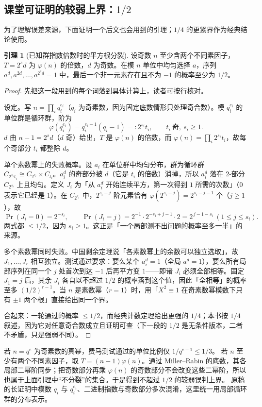 \documentclass[UTF8,a4paper,11pt,twoside,openright,fontset=fandol]{ctexbook}
\theoremstyle{definition}
\newtheorem{lemma}[definition]{引理}
\begin{document}
\subsection{课堂可证明的较弱上界：\texorpdfstring{$1/2$}{1/2}}
为了理解误差来源，下面证明一个后文也会用到的引理；$1/4$ 的更紧界作为经典结论使用。
\begin{lemma}[已知群指数倍数时的平方根分裂]
设奇数 $n$ 至少含两个不同素因子，$T=2^s d$ 为 $\varphi(n)$ 的倍数，$d$ 为奇数。在模 $n$ 单位中均匀选择 $a$，序列 $a^d,a^{2d},\ldots,a^{2^sd}=1$ 中，最后一个非一元素存在且不为 $-1$ 的概率至少为 $1/2$。
\end{lemma}
\begin{proof}
先把这一段用到的每个词落到具体计算上，读者可按行核对。

设定。写 $n=\prod_i q_i^{e_i}$（$q_i$ 为奇素数，因为固定底数情形只处理奇合数）。模 $q_i^{e_i}$ 的单位群是循环群，阶为
\[
 \varphi(q_i^{e_i})=q_i^{e_i-1}(q_i-1)=:2^{s_i}t_i,\qquad t_i\ \text{奇},\ s_i\ge1 .
\]
$d$ 由 $n-1=2^s d$（$d$ 奇）给出，$T$ 是 $\varphi(n)$ 的倍数，而 $\varphi(n)=\prod_i2^{s_i}t_i$，故每个奇部分 $t_i$ 都整除 $d$。

单个素数幂上的失败概率。设 $a_i$ 在单位群中均匀分布，群为循环群 $C_{2^{s_i}t_i}\cong C_{2^{s_i}}\times C_{t_i}$。$a_i^d$ 的奇部分被 $d$（它是 $t_i$ 的倍数）消掉，所以 $a_i^d$ 落在 $2$-部分 $C_{2^{s_i}}$ 上且均匀。定义 $J_i$ 为「从 $a_i^d$ 开始连续平方，第一次得到 $1$ 所需的次数」（$0$ 表示它已经是 $1$）。在 $C_{2^{s_i}}$ 中，$2^{s_i-j}$ 阶元素恰有 $\varphi(2^{s_i-j})=2^{s_i-j-1}$ 个（$j\ge1$），故
\[
 \Pr(J_i=0)=2^{-s_i},\qquad \Pr(J_i=j)=2^{-1}\cdot2^{-s_i+j-1}\cdot2=2^{\,j-1-s_i}\ (1\le j\le s_i).
\]
两式都 $\le1/2$，因为 $s_i\ge1$。这正是「一个局部测不出问题的概率至多一半」的来源。

多个素数幂同时失败。中国剩余定理说「各素数幂上的余数可以独立选取」，故 $J_1,\ldots,J_r$ 相互独立。测试通过要求：要么某个 $a_i^d=1$（全局 $a^d=1$），要么所有局部序列在同一个 $j$ 处首次到达 $-1$ 后再平方变 $1$——即诸 $J_i$ 必须全部相等。固定 $J_1=j$ 后，其余 $J_i$ 各自以不超过 $1/2$ 的概率落到这个值，因此「全相等」的概率至多 $(1/2)^{r-1}$。当 $n$ 是素数幂（$r=1$）时，用「$X^2\equiv1$ 在奇素数幂模数下只有 $\pm1$ 两个根」直接给出同一个界。

合起来：一轮通过的概率 $\le1/2$，而经典计数定理给出更强的 $1/4$；本书按 $1/4$ 叙述，因为它对任意奇合数成立且证明可查（下一段的 $1/2$ 是无条件版本，二者不矛盾，只是强弱不同）。
\end{proof}
若 $n=q^e$ 为奇素数的真幂，费马测试通过的单位比例仅 $1/q^{e-1}\le1/3$。
若 $n$ 至少有两个不同素因子，取 $T=(n-1)\varphi(n)$。通过 Miller--Rabin 的底数，其各局部二幂阶同步；把奇数部分再乘 $\varphi(n)$ 的奇数部分不会改变这些二幂阶，所以也属于上面引理中“不分裂”的集合。于是得到不超过 $1/2$ 的较弱误判上界。
原稿的长证明中模数 $q_i$ 与 $q_i^{e_i}$、二进制指数与奇数部分多次混淆，这里统一用局部循环群的分布表示。
\end{document}

